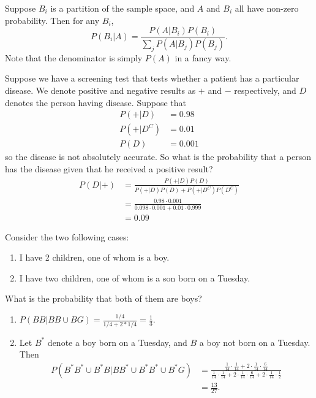 \documentclass[a4paper]{article}
\begin{document}
\begin{thm}
  Suppose $B_i$ is a partition of the sample space, and $A$ and $B_i$ all have non-zero probability. Then for any $B_i$,
  \[
    P(B_i | A) = \frac{P(A | B_i)P(B_i)}{\sum_jP(A | B_j)P(B_j)}.
  \]
  Note that the denominator is simply $P(A)$ in a fancy way.
\end{thm}

\begin{eg}
  Suppose we have a screening test that tests whether a patient has a particular disease. We denote positive and negative results as $+$ and $-$ respectively, and $D$ denotes the person having disease. Suppose that
  \begin{align*}
    P(+ | D) &= 0.98\\
    P(+ | D^C) &= 0.01\\
    P(D) &= 0.001
  \end{align*}
  so the disease is not absolutely accurate. So what is the probability that a person has the disease given that he received a positive result?
  \begin{align*}
    P(D|+) &= \frac{P(+ | D)P(D)}{P(+|D)P(D) + P(+|D^C)P(D^C)}\\
    &= \frac{0.98\cdot 0.001}{0.098\cdot 0.001 + 0.01\cdot 0.999}\\
    &=  0.09
  \end{align*}
\end{eg}

\begin{eg}
  Consider the two following cases:
  \begin{enumerate}
    \item I have 2 children, one of whom is a boy.
    \item I have two children, one of whom is a son born on a Tuesday.
  \end{enumerate}
  What is the probability that both of them are boys?

  \begin{enumerate}
    \item $P(BB|BB\cup BG) = \frac{1/4}{1/4 + 2*1/4} = \frac{1}{3}$.
    \item Let $B^*$ denote a boy born on a Tuesday, and $B$ a boy not born on a Tuesday. Then 
      \begin{align*}
        P(B^*B^* \cup B^*B| BB^* \cup B^*B^*\cup B^*G)&=\frac{\frac{1}{14}\cdot \frac{1}{14} + 2\cdot \frac{1}{14}\cdot\frac{6}{14}}{\frac{1}{14}\cdot \frac{1}{14} + 2\cdot \frac{1}{14}\cdot\frac{6}{14} + 2\cdot \frac{1}{14}\cdot \frac{1}{2}}\\
        &= \frac{13}{27}.
      \end{align*}
  \end{enumerate}
\end{eg}
\end{document}
